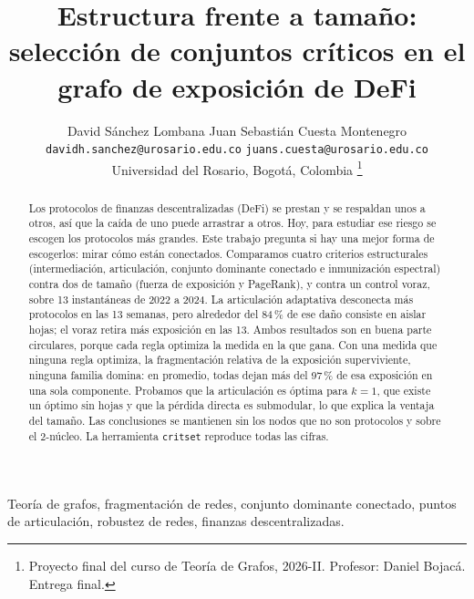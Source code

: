\documentclass[journal]{IEEEtran}
\begin{document}
\title{Estructura frente a tamaño: selección de conjuntos críticos
en el grafo de exposición de DeFi}

\author{David Sánchez Lombana \quad Juan Sebastián Cuesta Montenegro\\[2pt]
{\small\texttt{davidh.sanchez@urosario.edu.co} \quad
\texttt{juans.cuesta@urosario.edu.co}}\\[2pt]
{\small Universidad del Rosario, Bogotá, Colombia}%
\thanks{Proyecto final del curso de Teoría de Grafos, 2026-II.
Profesor: Daniel Bojacá. Entrega final.}}

\pagestyle{plain}

\maketitle

\begin{abstract}
Los protocolos de finanzas descentralizadas (DeFi) se prestan y se respaldan
unos a otros, así que la caída de uno puede arrastrar a otros. Hoy, para
estudiar ese riesgo se escogen los protocolos más grandes. Este trabajo pregunta
si hay una mejor forma de escogerlos: mirar cómo están conectados. Comparamos
cuatro criterios estructurales (intermediación, articulación, conjunto dominante
conectado e inmunización espectral) contra dos de tamaño (fuerza de exposición y
PageRank), y contra un control voraz, sobre 13 instantáneas de 2022 a 2024.
La articulación adaptativa desconecta más protocolos en las 13 semanas, pero
alrededor del 84\,\% de ese daño consiste en aislar hojas; el voraz retira más
exposición en las 13. Ambos resultados son en buena parte circulares, porque
cada regla optimiza la medida en la que gana. Con una medida que ninguna regla
optimiza, la fragmentación relativa de la exposición superviviente, ninguna
familia domina: en promedio, todas dejan más del 97\,\% de esa exposición en una sola
componente. Probamos que la articulación es óptima para $k=1$, que existe un
óptimo sin hojas y que la pérdida directa es submodular, lo que explica la
ventaja del tamaño. Las conclusiones se mantienen sin los nodos que no son
protocolos y sobre el 2-núcleo. La herramienta \texttt{critset} reproduce todas
las cifras.
\end{abstract}

\begin{IEEEkeywords}
Teoría de grafos, fragmentación de redes, conjunto dominante conectado,
puntos de articulación, robustez de redes, finanzas descentralizadas.
\end{IEEEkeywords}
\end{document}
